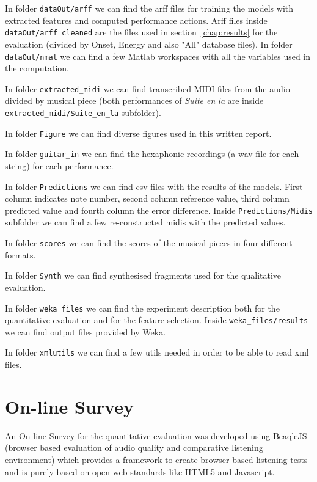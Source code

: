 \begin{appendices}
In folder \texttt{dataOut/arff} we can find the arff files for training the models with extracted features and computed performance actions. Arff files inside \texttt{dataOut/arff\_cleaned} are the files used in section~\ref{chap:results} for the evaluation (divided by Onset, Energy and also "All" database files). In folder \texttt{dataOut/nmat} we can find a few Matlab workspaces with all the variables used in the computation.

In folder \texttt{extracted\_midi} we can find transcribed MIDI files from the audio divided by musical piece (both performances of \textit{Suite en la} are inside \texttt{extracted\_midi/Suite\_en\_la} subfolder).

In folder \texttt{Figure} we can find diverse figures used in this written report.

In folder \texttt{guitar\_in} we can find the hexaphonic recordings (a wav file for each string) for each performance.

In folder \texttt{Predictions} we can find csv files with the results of the models. First column indicates note number, second column reference value, third column predicted value and fourth column the error difference. Inside \texttt{Predictions/Midis} subfolder we can find a few re-constructed midis with the predicted values.

In folder \texttt{scores} we can find the scores of the musical pieces in four different formats.

In folder \texttt{Synth} we can find synthesised fragments used for the qualitative evaluation.

In folder \texttt{weka\_files} we can find the experiment description both for the quantitative evaluation and for the feature selection. Inside \texttt{weka\_files/results} we can find output files provided by Weka.

In folder \texttt{xmlutils} we can find a few utils needed in order to be able to read xml files.

\cleardoublepage


\chapter{On-line Survey}
\label{app:survey}
An On-line Survey for the quantitative evaluation was developed using BeaqleJS (browser based evaluation of audio quality and comparative listening environment) which provides a framework to create browser based listening tests and is purely based on open web standards like HTML5 and Javascript.


\end{appendices}

